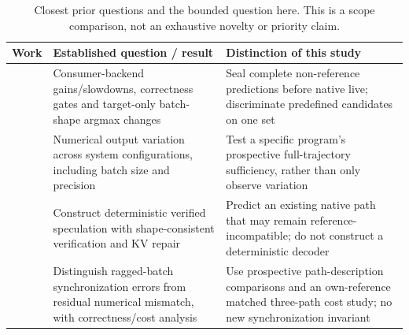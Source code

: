 \begin{table}[t]
\caption{Closest prior questions and the bounded question here. This is a scope comparison, not an exhaustive novelty or priority claim.}
\label{tab:nearestwork}
\centering
\begin{tabular}{@{}>{\raggedright\arraybackslash}p{1.48in}>{\raggedright\arraybackslash}p{2.27in}>{\raggedright\arraybackslash}p{2.35in}@{}}
\toprule
Work & Established question / result & Distinction of this study \\
\midrule
\citet{lossless} & Consumer-backend gains/slowdowns, correctness gates and target-only batch-shape argmax changes & Seal complete non-reference predictions before native live; discriminate predefined candidates on one set \\
\citet{numerics} & Numerical output variation across system configurations, including batch size and precision & Test a specific program's prospective full-trajectory sufficiency, rather than only observe variation \\
\citet{llm42} & Construct deterministic verified speculation with shape-consistent verification and KV repair & Predict an existing native path that may remain reference-incompatible; do not construct a deterministic decoder \\
\citet{batchcorrect} & Distinguish ragged-batch synchronization errors from residual numerical mismatch, with correctness/cost analysis & Use prospective path-description comparisons and an own-reference matched three-path cost study; no new synchronization invariant \\
\bottomrule
\end{tabular}
\end{table}
